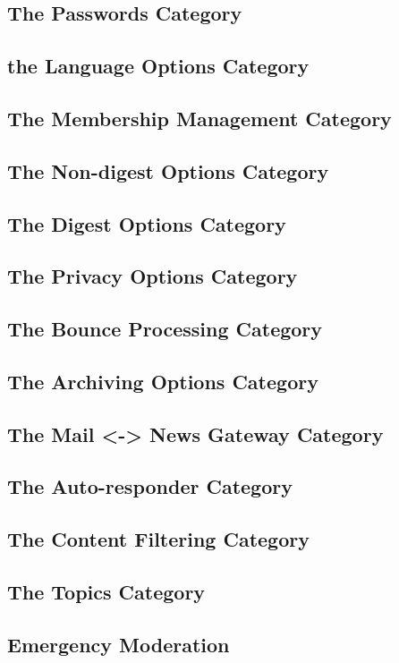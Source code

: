 \documentclass{howto}
\begin{document}
\subsection{The Passwords Category}
\subsection{the Language Options Category}
\subsection{The Membership Management Category}
\subsection{The Non-digest Options Category}
\subsection{The Digest Options Category}
\subsection{The Privacy Options Category}
\subsection{The Bounce Processing Category}
\subsection{The Archiving Options Category}
\subsection{The Mail <-> News Gateway Category}
\subsection{The Auto-responder Category}
\subsection{The Content Filtering Category}
\subsection{The Topics Category}
\subsection{Emergency Moderation}
\end{document}
